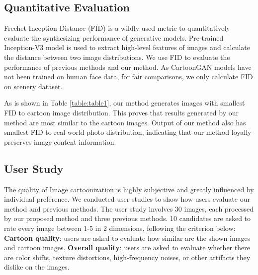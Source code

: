 \documentclass[10pt,twocolumn,letterpaper]{article}
\begin{document}
\subsection{Quantitative Evaluation}
\vspace{-0.3em}
Frechet Inception Distance (FID) \cite{heusel2017gans} is a wildly-used metric to quantitatively evaluate the synthesizing performance of generative models. Pre-trained Inception-V3 model \cite{szegedy2016rethinking} is used to extract high-level features of images and calculate the distance between two image distributions. We use FID to evaluate the performance of previous methods and our method. As CartoonGAN models have not been trained on human face data, for fair comparisons, we only calculate FID on scenery dataset.

As is shown in Table \ref{table:table1}, our method generates images with smallest FID to cartoon image distribution. This proves that results generated by our method are most similar to the cartoon images. Output of our method also has smallest FID to real-world photo distribution, indicating that our method loyally preserves image content information.
\vspace{-0.3em}
\subsection{User Study}
\vspace{-0.3em}
The quality of Image cartoonization is highly subjective and greatly influenced by individual preference. We conducted user studies to show how users evaluate our method and previous methods. The user study involves 30 images, each processed by our proposed method and three previous methods. 10 candidates are asked to rate every image between 1-5 in 2 dimensions, following the criterion below:
	\newline \textbf{Cartoon quality}: users are asked to evaluate how similar are the shown images and cartoon images.
	\newline \textbf{Overall quality}: users are asked to evaluate whether there are color shifts, texture distortions, high-frequency noises, or other artifacts they dislike on the images.
\end{document}
